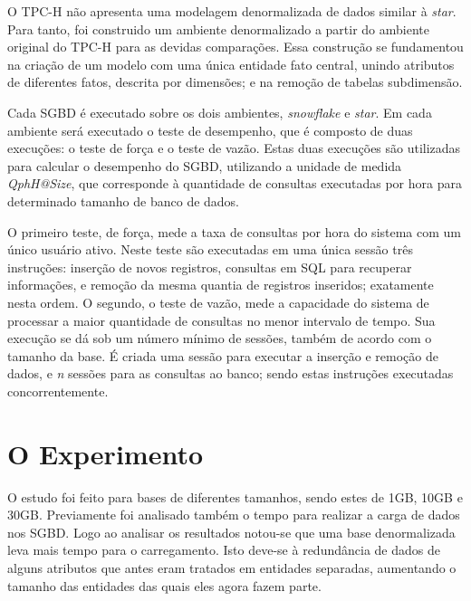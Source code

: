 \documentclass[12pt]{article}
\begin{document}
O TPC-H não apresenta uma modelagem denormalizada de dados similar à \textit{star}. Para tanto, foi construido 
um ambiente denormalizado a partir do ambiente original do TPC-H para as devidas comparações. 
Essa construção se fundamentou na criação de um modelo com 
uma única entidade fato central, unindo atributos de diferentes fatos, descrita por dimensões; e 
na remoção de tabelas subdimensão.

Cada SGBD é executado sobre os dois ambientes, \textit{snowflake} e \textit{star}.
Em cada ambiente será executado o teste de desempenho, que é composto de duas execuções: 
o teste de força e o teste de vazão. Estas duas execuções são utilizadas para calcular o 
desempenho do SGBD, utilizando a unidade de medida \textit{QphH@Size}, que corresponde à quantidade 
de consultas executadas por hora para determinado tamanho de banco de dados.

O primeiro teste, de força, mede a taxa de consultas por hora do sistema com um único usuário ativo. 
Neste teste são executadas em uma única sessão três instruções: inserção de novos registros, consultas 
em SQL para recuperar informações, e remoção da mesma quantia de registros inseridos; exatamente nesta ordem. O 
segundo, o teste de vazão, mede a capacidade do sistema de processar a maior quantidade de consultas no menor 
intervalo de tempo. Sua execução se dá sob um número mínimo de sessões, também de acordo com o tamanho 
da base. É criada uma sessão para executar a inserção e remoção de dados, e \textit{n} sessões para as consultas ao 
banco; sendo estas instruções executadas concorrentemente.

\section{O Experimento}

O estudo foi feito para bases de diferentes tamanhos, sendo estes de 1GB, 10GB e 30GB. Previamente foi analisado 
também o tempo para realizar a carga de dados nos SGBD. Logo ao analisar os resultados notou-se que uma base 
denormalizada leva mais tempo para o carregamento. Isto deve-se à redundância de dados de alguns atributos que 
antes eram tratados em entidades separadas, aumentando o tamanho das entidades das quais eles agora fazem parte.




\end{document}
